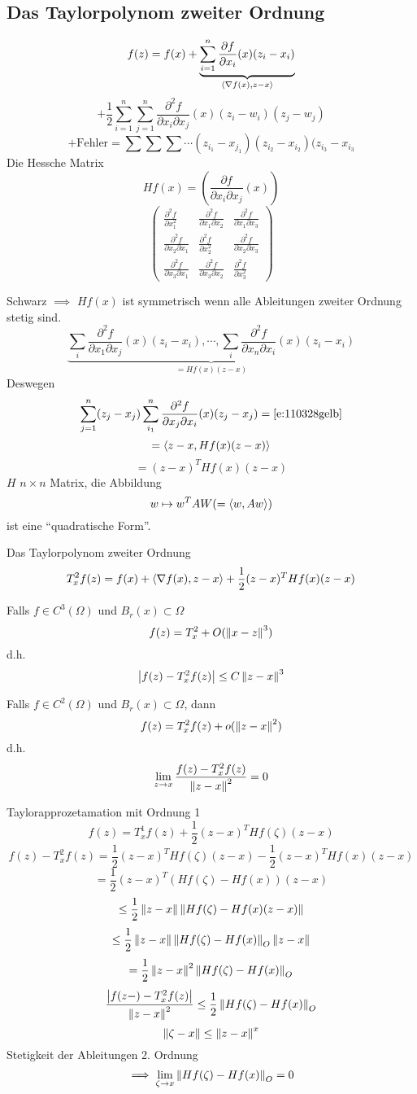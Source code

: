 \subsection{Das Taylorpolynom zweiter Ordnung}
\[f(z)=f(x)+\underbrace{\sum^n_{i=1}\dfrac{\partial f}{\partial x_i}(x)(z_i-x_i)}_{\langle \nabla f(x), z-x \rangle}\]
\begin{equation}
  \label{e:110328gelb}
  +\frac{1}{2}\sum^n_{i=1}\sum^n_{j=1}\frac{\partial^2f}{\partial x_i\partial x_j}(x)(z_i-w_i)(z_j-w_j)
\end{equation}
\[+ \text{Fehler} = \sum\sum\sum\cdots(z_{i_1}-x_{j_1})(z_{i_2}-x_{i_2})(z_{i_3}-x_{i_3}\]
Die Hessche Matrix
\[Hf(x)=\left( \frac{\partial f}{\partial x_i\partial x_j}(x) \right)\]
\[ \begin{pmatrix}
  \frac{\partial^2 f}{\partial x_1^2} & \frac{\partial^2 f}{\partial x_1\partial x_2} & \frac{\partial^2 f}{\partial x_1\partial x_3} \\
  \frac{\partial^2 f}{\partial x_2\partial x_1} & \frac{\partial^2 f}{\partial x_2^2} & \frac{\partial^2 f}{\partial x_2\partial x_3} \\
  \frac{\partial^2 f}{\partial x_3\partial x_1} & \frac{\partial^2 f}{\partial x_3\partial x_2}& \frac{\partial^2 f}{\partial x_3^2}
\end{pmatrix}\]
\begin{Bem}
  Schwarz $\implies$ $Hf(x)$ ist symmetrisch wenn alle Ableitungen zweiter Ordnung stetig sind.
  \[\underbrace{\sum_i\frac{\partial^2 f}{\partial x_1\partial x_j}(x)(z_i-x_i),\cdots,\sum_i\frac{\partial^2 f}{\partial x_n\partial x_i}(x)(z_i-x_i)}_{=Hf(x)(z-x)}\]
  Deswegen
  \[\sum^n_{j=1}(z_j-x_j)\sum^n_{i_1}\frac{\partial^2 f}{\partial x_j\partial x_i}(x)(z_j-x_j)=\ref{e:110328gelb}\]
  \[=\langle z-x, Hf(x)(z-x) \rangle\]
  \[=(z-x)^THf(x)(z-x)\]
  $H$ $n\times n$ Matrix, die Abbildung
  \[w\mapsto w^T A W (=\langle w,Aw \rangle)\]
  ist eine ``quadratische Form''.
\end{Bem}
Das Taylorpolynom zweiter Ordnung
\[T^2_xf(z)=f(x)+\langle \nabla f(x), z-x \rangle+\frac{1}{2}(z-x)^T Hf(x)(z-x)\]
\begin{Kor}
  Falls $f\in C^3(\Omega)$ und $B_r(x)\subset\Omega$
  \[f(z)=T^2_x+O(\left\| x-z \right\|^3)\]
  d.h.
  \[\left| f(z)-T_x^2f(z) \right|\leq C\left\| z-x \right\|^3\]
\end{Kor}
\begin{Kor}
  Falls $f\in C^2(\Omega)$ und $B_r(x)\subset\Omega$, dann
  \[f(z)=T^2_xf(z)+o(\left\| z-x \right\|^2)\]
  d.h.
  \[\lim_{z\rightarrow x}\frac{f(z)-T_x^2f(z)}{\left\| z-x \right\|^2}=0\]
\end{Kor}
\begin{Bew}
  Taylorapprozetamation mit Ordnung 1
  \[f(z)=T^1_xf(z)+\frac{1}{2}(z-x)^THf(\zeta)(z-x)\]
  \[f(z)-T_x^2f(z)=\frac{1}{2}(z-x)^THf(\zeta)(z-x)-\frac{1}{2}(z-x)^THf(x)(z-x)\]
  \[=\frac{1}{2}(z-x)^T(Hf(\zeta)-Hf(x))(z-x)\]
  \[\leq \frac{1}{2}\left\| z-x \right\|\left\| Hf(\zeta)-Hf(x)(z-x) \right\|\]
  \[\leq \frac{1}{2}\left\| z-x \right\|\left\| Hf(\zeta)-Hf(x) \right\|_O\left\| z-x \right\|\]
  \[= \frac{1}{2}\left\| z-x \right\|^2\left\| Hf(\zeta)-Hf(x) \right\|_O\]
  \[\frac{\left| f(z-)-T_x^2f(z) \right|}{\left\| z-x \right\|^2}\leq\frac{1}{2}\left\| Hf(\zeta)-Hf(x) \right\|_O\]
  \[\left\| \zeta-x \right\|\leq\left\| z-x \right\|^x\]
  Stetigkeit der Ableitungen 2. Ordnung
  \[\implies \lim_{\zeta\rightarrow x}\left\| Hf(\zeta)-Hf(x) \right\|_O=0\]
\end{Bew}
